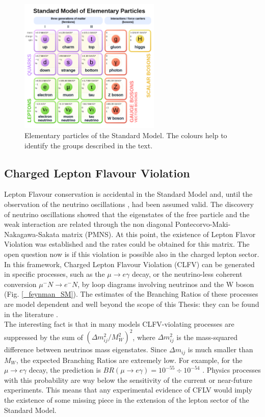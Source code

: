 \documentclass[12pt,a4paper,openright, oneside, titlepage]{book} %
\begin{document}
\begin{figure}[h!]
\centering
\includegraphics[width =0.6\textwidth, keepaspectratio]{SM}
\caption[Elementary particles of the Standard Model]{Elementary particles of the Standard Model. 
The colours help to identify the groups described in the text.}
\label{_SM}
\end{figure}

\subsection{Charged Lepton Flavour Violation}
Lepton Flavour conservation is accidental in the Standard Model and, 
until the observation of the neutrino oscillations  \cite{oscillations}, had been assumed valid. 
The discovery of neutrino oscillations showed that the eigenstates 
of the free particle and the weak  interaction are related 
through the non diagonal Pontecorvo-Maki-Nakagawa-Sakata matrix (PMNS).
At this point, the existence of  Lepton Flavor Violation was established 
and the rates could be obtained for this matrix.
The open question now is if this violation is possible also in the charged lepton sector. 
In this framework, 
Charged Lepton Flavour Violation (CLFV) can be generated in specific processes, 
such as the $\mu\rightarrow e\gamma$ decay, 
or the neutrino-less coherent conversion $\mu^-N \rightarrow e^-N$, 
by loop diagrams involving neutrinos and the W boson (Fig. \ref{_feynman_SM}).
The estimates of the Branching Ratios of these processes 
are model dependent and well beyond the scope of this Thesis: 
they can be found in the literature  \cite{signorelli}. \\
The interesting fact is that in many models 
CLFV-violating processes are suppressed 
by the sum of $(\Delta m_{ij}^2/M_W^2)^2$, 
where $\Delta m_{ij}^2$ is the mass-squared difference between neutrinos mass eigenstates. 
Since $\Delta m_{ij}$ is much smaller than $M_W$, 
the expected Branching Ratios are extremely low. 
For example, for the $\mu\rightarrow e\gamma$ decay,
the prediction is  
$BR(\mu\rightarrow e\gamma)= 10^{-55}\div10^{-54}$ \cite {Petcov}. 
Physics processes with this probability are way below the sensitivity of the current or near-future experiments.
This means that any experimental evidence of CFLV 
would imply the existence of some missing piece 
in the extension of the lepton sector of the Standard Model.
\end{document}
